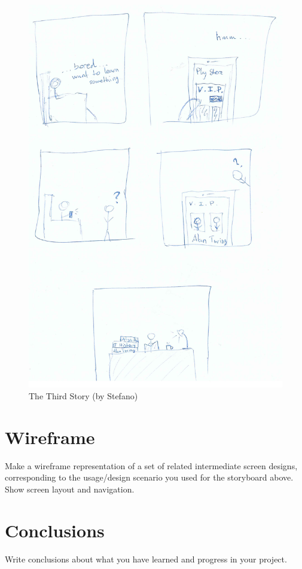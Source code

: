 \documentclass[12pt]{scrartcl}
\begin{document}
	\begin{figure}[H]
        		\centering
       		\includegraphics[width=\textwidth]{../images/story3.jpg}
       		\caption{The Third Story (by Stefano)}
        		\label{story3}
	\end{figure}
	
	

\section{Wireframe}

	Make a wireframe representation of a set of related intermediate screen designs, corresponding to the usage/design scenario you used for the storyboard above.  Show screen layout and navigation.
	
	
	
\section{Conclusions}

	Write conclusions about what you have learned and progress in your project.
	
\end{document}
